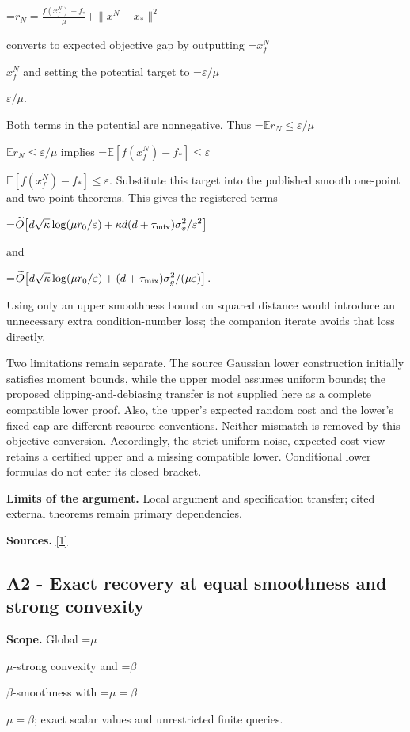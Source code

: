 \documentclass[10pt,a4paper]{article}
\newcommand{\AtlasMath}[1]{\par\begingroup\centering\setbox0=\hbox{$\displaystyle #1$}\ifdim\wd0>1.4\linewidth\typeout{ATLAS WIDE FORMULA: \the\wd0}\fi\ifdim\wd0>\linewidth\resizebox{\linewidth}{!}{\box0}\else\box0\fi\par\endgroup}
\newcommand{\AtlasInlineMath}[1]{\begingroup\setbox0=\hbox{$#1$}\ifdim\wd0>.4\linewidth\endgroup\AtlasMath{#1}\else\endgroup$#1$\fi}
\begin{document}
\AtlasMath{r_N=\frac{f(x_f^N)-f_*}{\mu}+\|x^N-x_*\|^2}

converts to expected objective gap by outputting \AtlasInlineMath{x_f^N} and setting the potential target to \AtlasInlineMath{\varepsilon/\mu}.

Both terms in the potential are nonnegative. Thus \AtlasInlineMath{\mathbb E r_N\le\varepsilon/\mu} implies \AtlasInlineMath{\mathbb E[f(x_f^N)-f_*]\le\varepsilon}. Substitute this target into the published smooth one-point and two-point theorems. This gives the registered terms

\AtlasMath{\widetilde O\!\left[d\sqrt\kappa\log(\mu r_0/\varepsilon)+\kappa d(d+\tau_{\rm mix})\sigma_v^2/\varepsilon^2\right]}

and

\AtlasMath{\widetilde O\!\left[d\sqrt\kappa\log(\mu r_0/\varepsilon)+(d+\tau_{\rm mix})\sigma_g^2/(\mu\varepsilon)\right].}

Using only an upper smoothness bound on squared distance would introduce an unnecessary extra condition-number loss; the companion iterate avoids that loss directly.

Two limitations remain separate. The source Gaussian lower construction initially satisfies moment bounds, while the upper model assumes uniform bounds; the proposed clipping-and-debiasing transfer is not supplied here as a complete compatible lower proof. Also, the upper's expected random cost and the lower's fixed cap are different resource conventions. Neither mismatch is removed by this objective conversion. Accordingly, the strict uniform-noise, expected-cost view retains a certified upper and a missing compatible lower. Conditional lower formulas do not enter its closed bracket.

\textbf{Limits of the argument.} Local argument and specification transfer; cited external theorems remain primary dependencies.

\textbf{Sources.} \href{https://proceedings.mlr.press/v306/prokhorov26a.html}{[1]}

\subsection{A2 - Exact recovery at equal smoothness and strong convexity}
\textbf{Scope.} Global \AtlasInlineMath{\mu}-strong convexity and \AtlasInlineMath{\beta}-smoothness with \AtlasInlineMath{\mu=\beta}; exact scalar values and unrestricted finite queries.
\end{document}
